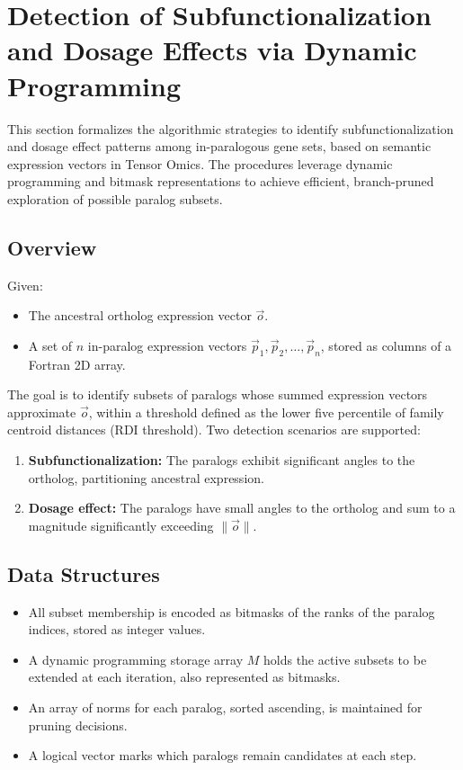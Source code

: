 \section{Detection of Subfunctionalization and Dosage Effects via Dynamic Programming}

    This section formalizes the algorithmic strategies to identify subfunctionalization and dosage effect patterns among in-paralogous gene sets, based on semantic expression vectors in Tensor Omics. The procedures leverage dynamic programming and bitmask representations to achieve efficient, branch-pruned exploration of possible paralog subsets.

    \subsection{Overview}

        Given:
        \begin{itemize}
            \item The ancestral ortholog expression vector $\vec{o}$.
            \item A set of $n$ in-paralog expression vectors $\vec{p}_1, \vec{p}_2, \dots, \vec{p}_n$, stored as columns of a Fortran 2D array.
        \end{itemize}

        The goal is to identify subsets of paralogs whose summed expression vectors approximate $\vec{o}$, within a threshold defined as the lower five percentile of family centroid distances (RDI threshold). Two detection scenarios are supported:

        \begin{enumerate}
            \item \textbf{Subfunctionalization:} The paralogs exhibit significant angles to the ortholog, partitioning ancestral expression.
            \item \textbf{Dosage effect:} The paralogs have small angles to the ortholog and sum to a magnitude significantly exceeding $\|\vec{o}\|$.
        \end{enumerate}

        \subsection{Data Structures}

        \begin{itemize}
            \item All subset membership is encoded as bitmasks of the ranks of the paralog indices, stored as integer values.
            \item A dynamic programming storage array $M$ holds the active subsets to be extended at each iteration, also represented as bitmasks.
            \item An array of norms for each paralog, sorted ascending, is maintained for pruning decisions.
            \item A logical vector marks which paralogs remain candidates at each step.
        \end{itemize}

